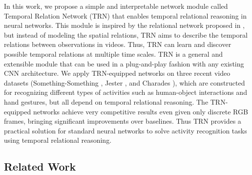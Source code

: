 \documentclass[runningheads]{llncs}
\begin{document}
In this work, we propose a simple and interpretable network module called Temporal Relation Network (TRN) that enables temporal relational reasoning in neural networks. This module is inspired by the relational network proposed in \cite{santoro2017simple}, but instead of modeling the spatial relations, TRN aims to describe the temporal relations between observations in videos. Thus, TRN can learn and discover possible temporal relations at multiple time scales. TRN is a general and extensible module that can be used in a plug-and-play fashion with any existing CNN architecture. We apply TRN-equipped networks on three recent video datasets (Something-Something \cite{goyal2017something}, Jester \cite{jester}, and Charades \cite{sigurdsson2016hollywood}), which are constructed for recognizing different types of activities such as human-object interactions and hand gestures, but all depend on temporal relational reasoning. The TRN-equipped networks achieve very competitive results even given only discrete RGB frames, bringing significant improvements over baselines. Thus TRN provides a practical solution for standard neural networks to solve activity recognition tasks using temporal relational reasoning.

\subsection{Related Work}
\end{document}
